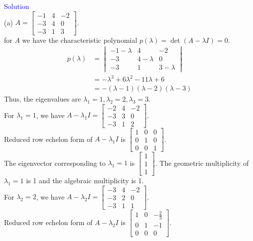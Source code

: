 \textcolor{blue}{Solution} \\
(a) $A=\begin{bmatrix} -1 & 4 & -2 \\ -3 & 4 & 0 \\ -3 & 1 & 3 \end{bmatrix}$.\\
for $A$ we have the characteristic polynomial $p(\lambda) = \det(A - \lambda I) = 0$.
\begin{align*}
    p(\lambda) &= \begin{vmatrix} -1-\lambda & 4 & -2 \\ -3 & 4-\lambda & 0 \\ -3 & 1 & 3-\lambda \end{vmatrix} \\
    &= -\lambda^3 + 6\lambda^2 - 11\lambda + 6 \\
    &= -(\lambda - 1)(\lambda - 2)(\lambda - 3)
\end{align*}
Thus, the eigenvalues are $\lambda_1 = 1, \lambda_2 = 2, \lambda_3 = 3$.\\
For $\lambda_1 = 1$, we have $A - \lambda_1 I = \begin{bmatrix} -2 & 4 & -2 \\ -3 & 3 & 0 \\ -3 & 1 & 2 \end{bmatrix}$.\\
Reduced row echelon form of $A - \lambda_1 I$ is $\begin{bmatrix} 1 & 0 & 0 \\ 0 & 1 & 0 \\ 0 & 0 & 1 \end{bmatrix}$.\\
The eigenvector corresponding to $\lambda_1 = 1$ is $\begin{bmatrix} 1 \\ 1 \\ 1 \end{bmatrix}$. The geometric multiplicity of $\lambda_1 = 1$ is 1 and the algebraic multiplicity is 1.\\
For $\lambda_2 = 2$, we have $A - \lambda_2 I = \begin{bmatrix} -3 & 4 & -2 \\ -3 & 2 & 0 \\ -3 & 1 & 1 \end{bmatrix}$.\\
Reduced row echelon form of $A - \lambda_2 I$ is $\begin{bmatrix} 1 & 0 & -\frac{2}{3} \\ 0 & 1 & -1 \\ 0 & 0 & 0 \end{bmatrix}$.\\
